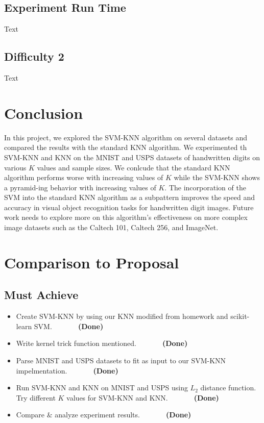 \documentclass[11pt,letterpaper]{article}
\begin{document}
\subsection{Experiment Run Time}

Text

\subsection{Difficulty 2}

Text

\section{Conclusion}

In this project, we explored the SVM-KNN algorithm on several datasets and compared the results with the standard KNN algorithm. We experimented th SVM-KNN and KNN on the MNIST and USPS datasets of handwritten digits on various $K$ values and sample sizes. We conlcude that the standard KNN algorithm performs worse with increasing values of $K$ while the SVM-KNN shows a pyramid-ing behavior with increasing values of $K$. The incorporation of the SVM into the standard KNN algorithm as a subpattern improves the speed and accuracy in visual object recognition tasks for handwritten digit images. Future work needs to explore more on this algorithm's effectiveness on more complex image datasets such as the Caltech 101, Caltech 256, and ImageNet.

\section{Comparison to Proposal}

\subsection{Must Achieve}

\begin{itemize}
\item Create SVM-KNN by using our KNN modified from homework and scikit-learn SVM. $\>\>\>\>\>\>\>\>\>\>\>\>\>\>\>$\textbf{(Done)}
\item Write kernel trick function mentioned. $\>\>\>\>\>\>\>\>\>\>\>\>\>\>\>$\textbf{(Done)}
\item Parse MNIST and USPS datasets to fit as input to our SVM-KNN impelmentation. $\>\>\>\>\>\>\>\>\>\>\>\>\>\>\>$\textbf{(Done)}
\item Run SVM-KNN and KNN on MNIST and USPS using $L_2$ distance function. Try different $K$ values for SVM-KNN and KNN. $\>\>\>\>\>\>\>\>\>\>\>\>\>\>\>$\textbf{(Done)}
\item Compare $\&$ analyze experiment results. $\>\>\>\>\>\>\>\>\>\>\>\>\>\>\>$\textbf{(Done)}
\end{itemize}
\end{document}
